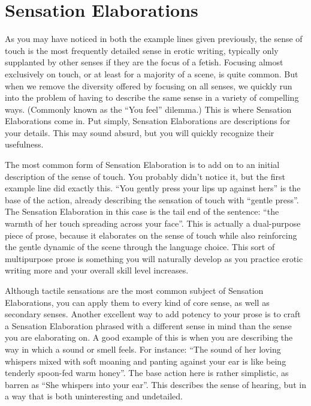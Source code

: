 \documentclass[Coomer-main.tex]{subfiles}
\begin{document}
\section{Sensation Elaborations}

As you may have noticed in both the example lines given previously, the sense of touch is the most frequently detailed sense in erotic writing, typically only supplanted by other senses if they are the focus of a fetish.
Focusing almost exclusively on touch, or at least for a majority of a scene, is quite common.
But when we remove the diversity offered by focusing on all senses, we quickly run into the problem of having to describe the same sense in a variety of compelling ways.
(Commonly known as the “You feel” dilemma.)
This is where Sensation Elaborations come in.
Put simply, Sensation Elaborations are descriptions for your details.
This may sound absurd, but you will quickly recognize their usefulness.

The most common form of Sensation Elaboration is to add on to an initial description of the sense of touch.
You probably didn’t notice it, but the first example line did exactly this.
“You gently press your lips up against hers” is the base of the action, already describing the sensation of touch with “gentle press”.
The Sensation Elaboration in this case is the tail end of the sentence: “the warmth of her touch spreading across your face”.
This is actually a dual-purpose piece of prose, because it elaborates on the sense of touch while also reinforcing the gentle dynamic of the scene through the language choice.
This sort of multipurpose prose is something you will naturally develop as you practice erotic writing more and your overall skill level increases.

Although tactile sensations are the most common subject of Sensation Elaborations, you can apply them to every kind of core sense, as well as secondary senses.
Another excellent way to add potency to your prose is to craft a Sensation Elaboration phrased with a different sense in mind than the sense you are elaborating on.
A good example of this is when you are describing the way in which a sound or smell feels.
For instance: “The sound of her loving whispers mixed with soft moaning and panting against your ear is like being tenderly spoon-fed warm honey”.
The base action here is rather simplistic, as barren as “She whispers into your ear”.
This describes the sense of hearing, but in a way that is both uninteresting and undetailed.
\end{document}
